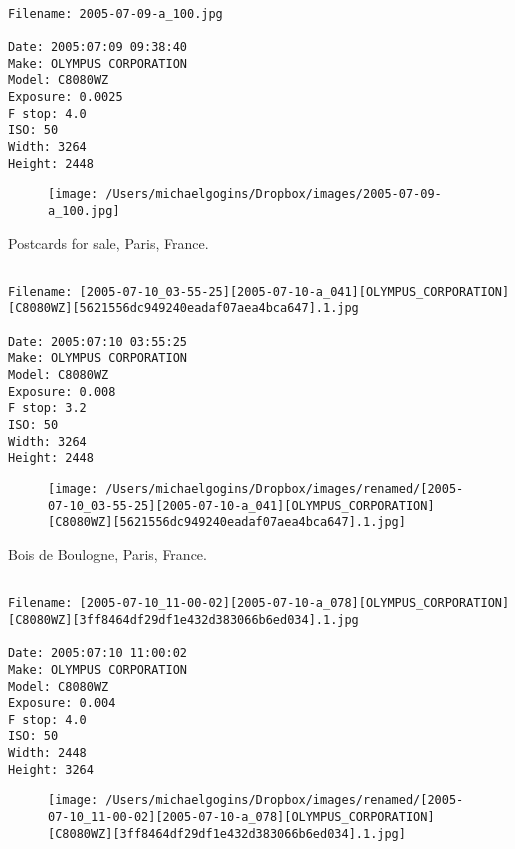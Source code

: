 \documentclass[11pt,letter,DIV=14,paper=landscape]{scrbook}
\begin{document}
\clearpage
\noindent 
\noindent
\begin{lstlisting}

Filename: 2005-07-09-a_100.jpg

Date: 2005:07:09 09:38:40
Make: OLYMPUS CORPORATION
Model: C8080WZ
Exposure: 0.0025
F stop: 4.0
ISO: 50
Width: 3264
Height: 2448
\end{lstlisting}
\clearpage

\begin{figure}
\texttt{[image: /Users/michaelgogins/Dropbox/images/2005-07-09-a\_100.jpg]}
\end{figure}
    
\clearpage
\noindent Postcards for sale, Paris, France.
\noindent
\begin{lstlisting}

Filename: [2005-07-10_03-55-25][2005-07-10-a_041][OLYMPUS_CORPORATION][C8080WZ][5621556dc949240eadaf07aea4bca647].1.jpg

Date: 2005:07:10 03:55:25
Make: OLYMPUS CORPORATION
Model: C8080WZ
Exposure: 0.008
F stop: 3.2
ISO: 50
Width: 3264
Height: 2448
\end{lstlisting}
\clearpage

\begin{figure}
\texttt{[image: /Users/michaelgogins/Dropbox/images/renamed/[2005-07-10\_03-55-25][2005-07-10-a\_041][OLYMPUS\_CORPORATION][C8080WZ][5621556dc949240eadaf07aea4bca647].1.jpg]}
\end{figure}
    
\clearpage
\noindent Bois de Boulogne, Paris, France.
\noindent
\begin{lstlisting}

Filename: [2005-07-10_11-00-02][2005-07-10-a_078][OLYMPUS_CORPORATION][C8080WZ][3ff8464df29df1e432d383066b6ed034].1.jpg

Date: 2005:07:10 11:00:02
Make: OLYMPUS CORPORATION
Model: C8080WZ
Exposure: 0.004
F stop: 4.0
ISO: 50
Width: 2448
Height: 3264
\end{lstlisting}
\clearpage

\begin{figure}
\texttt{[image: /Users/michaelgogins/Dropbox/images/renamed/[2005-07-10\_11-00-02][2005-07-10-a\_078][OLYMPUS\_CORPORATION][C8080WZ][3ff8464df29df1e432d383066b6ed034].1.jpg]}
\end{figure}
    
\end{document}
